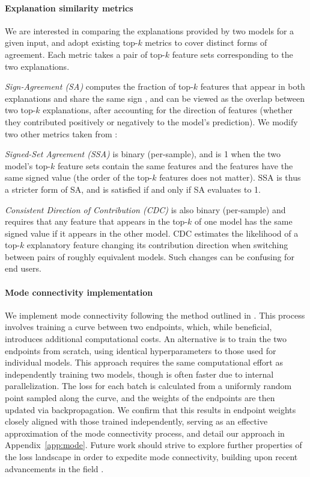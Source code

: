\paragraph{Explanation similarity metrics} We are interested in comparing the explanations provided by two models for a given input, and adopt existing top-$k$ metrics to cover distinct forms of agreement. Each metric takes a pair of top-$k$ feature sets corresponding to the two explanations.

\textit{Sign-Agreement (SA)} computes the fraction of top-$k$ features that appear in both explanations and share the same sign \citep{krishna2022}, and can be viewed as the overlap between two top-$k$ explanations, after accounting for the direction of features (whether they contributed positively or negatively to the model's prediction). We modify two other metrics taken from \cite{brunet2022}: 

\textit{Signed-Set Agreement (SSA)} is binary (per-sample), and is 1 when the two model's top-$k$ feature sets contain the same features and the features have the same signed value (the order of the top-$k$ features does not matter). SSA is thus a stricter form of SA, and is satisfied if and only if SA evaluates to 1.

\textit{Consistent Direction of Contribution (CDC)} is also binary (per-sample) and requires that any feature that appears in the top-$k$ of one model has the same signed value if it appears in the other model. CDC estimates the likelihood of a top-$k$ explanatory feature changing its contribution direction when switching between pairs of roughly equivalent models. Such changes can be confusing for end users.

\paragraph{Mode connectivity implementation} We implement mode connectivity following the method outlined in \citet{garipov2018}. This process involves training a curve between two endpoints, which, while beneficial, introduces additional computational costs. An alternative is to train the two endpoints from scratch, using identical hyperparameters to those used for individual models. This approach requires the same computational effort as independently training two models, though is often faster due to internal parallelization. The loss for each batch is calculated from a uniformly random point sampled along the curve, and the weights of the endpoints are then updated via backpropagation. We confirm that this results in endpoint weights closely aligned with those trained independently, serving as an effective approximation of the mode connectivity process, and detail our approach in Appendix~\ref{app:mode}. Future work should strive to explore further properties of the loss landscape in order to expedite mode connectivity, building upon recent advancements in the field \citep{ainsworth2023, draxler2019, garipov2018, gotmare2018, singh2020, tatro2020}.

